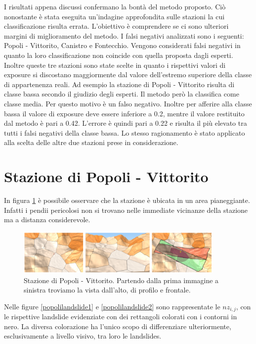 I risultati appena discussi confermano la bontà del metodo proposto. Ciò nonostante è stata eseguita un'indagine approfondita sulle stazioni la cui classificazione risulta errata. L'obiettivo è comprendere se ci sono ulteriori margini di miglioramento del metodo.
I falsi negativi analizzati sono i seguenti: Popoli - Vittorito, Canistro e Fontecchio. Vengono considerati falsi negativi in quanto la loro classificazione non coincide con quella proposta dagli esperti. Inoltre queste tre stazioni sono state scelte in quanto i rispettivi valori di exposure  si discostano maggiormente dal valore dell'estremo superiore della classe di appartenenza reali. Ad esempio la stazione di Popoli - Vittorito risulta di classe bassa secondo il giudizio degli esperti. Il metodo però la classifica come classe media. Per questo motivo è un falso negativo. Inoltre per afferire alla classe bassa il valore di exposure deve essere inferiore a 0.2, mentre il valore restituito dal metodo è pari a 0.42. L'errore è quindi pari a 0.22 e risulta il più elevato tra tutti i falsi negativi della classe bassa. Lo stesso ragionamento è stato applicato alla scelta delle altre due stazioni prese in considerazione. 

\newpage
\section{Stazione di Popoli - Vittorito}
In figura \ref{Popoli_Final} è possibile osservare che la stazione è ubicata in un area pianeggiante. Infatti i pendii pericolosi non si trovano nelle immediate vicinanze della stazione ma a distanza considerevole. 

	\begin{figure}[h]
	\centering
	\includegraphics[width=0.9\textwidth]{images/PopoliFinal}
	\caption{Stazione di Popoli - Vittorito. Partendo dalla prima immagine a sinistra  troviamo la vista dall'alto, di profilo e frontale.}
	\label{Popoli_Final}
\end{figure}

Nelle figure \ref{popolilandslide1} e \ref{popolilandslide2} sono rappresentate le $nz_{i,j}$, con le rispettive landslide evidenziate con dei rettangoli colorati con i contorni in nero. La diversa colorazione ha l'unico scopo di differenziare ulteriormente, esclusivamente a livello visivo, tra loro le landslides.


